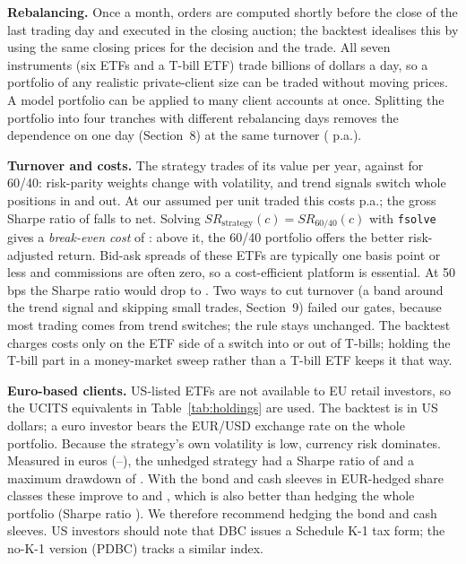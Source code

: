 \textbf{Rebalancing.} Once a month, orders are computed shortly before the close of the last trading day and executed in the
closing auction; the backtest idealises this by using the same closing prices for the decision and the trade. All seven instruments (six ETFs and a T-bill ETF) trade billions of dollars a day, so a
portfolio of any realistic private-client size can be traded without moving prices. A model portfolio can be applied to
many client accounts at once. Splitting the portfolio into four tranches with different rebalancing days removes the dependence on one day
(Section~8) at the same turnover ( p.a.).

\textbf{Turnover and costs.} The strategy trades  of its value per year, against 
for 60/40: risk-parity weights change with volatility, and trend signals switch whole positions in and out. At our assumed
 per unit traded this costs  p.a.; the gross Sharpe ratio of  falls to
 net. Solving $SR_{\text{strategy}}(c)=SR_{60/40}(c)$ with \texttt{fsolve} gives a \emph{break-even cost} of
: above it, the 60/40 portfolio offers the better risk-adjusted return. Bid-ask spreads of these ETFs are
typically one basis point or less and commissions are often zero, so a cost-efficient platform is essential. At 50 bps the
Sharpe ratio would drop to . Two ways to cut turnover (a band around the trend signal and skipping small trades, Section~9) failed our gates, because
most trading comes from trend switches; the rule stays unchanged. The backtest
charges costs only on the ETF side of a switch into or out of T-bills; holding the T-bill part in a money-market sweep
rather than a T-bill ETF keeps it that way.

\textbf{Euro-based clients.} US-listed ETFs are not available to EU retail investors, so the UCITS equivalents in
Table~\ref{tab:holdings} are used. The backtest is in US dollars; a euro investor bears the EUR/USD exchange rate on the
whole portfolio. Because the strategy's own volatility is low, currency risk dominates. Measured in euros
(--), the unhedged strategy had a Sharpe ratio of  and a maximum
drawdown of . With the bond and cash sleeves in EUR-hedged share classes these improve to
 and , which is also better than hedging the whole portfolio (Sharpe ratio
). We therefore recommend hedging the bond and cash sleeves. US investors should note that DBC issues a Schedule K-1 tax form; the
no-K-1 version (PDBC) tracks a similar index.
